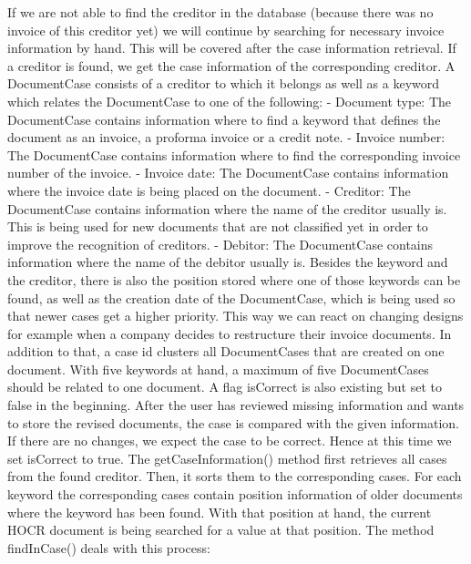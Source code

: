 If we are not able to find the creditor in the database (because there was no invoice of this creditor yet) we will continue by searching for necessary invoice information by hand. This will be covered after the case information retrieval.
If a creditor is found, we get the case information of the corresponding creditor. A DocumentCase consists of a creditor to which it belongs as well as a keyword which relates the DocumentCase to one of the following:
-	Document type: The DocumentCase contains information where to find a keyword that defines the document as an invoice, a proforma invoice or a credit note.
-	Invoice number: The DocumentCase contains information where to find the corresponding invoice number of the invoice.
-	Invoice date: The DocumentCase contains information where the invoice date is being placed on the document.
-	Creditor: The DocumentCase contains information where the name of the creditor usually is. This is being used for new documents that are not classified yet in order to improve the recognition of creditors.
-	Debitor: The DocumentCase contains information where the name of the debitor usually is.
Besides the keyword and the creditor, there is also the position stored where one of those keywords can be found, as well as the creation date of the DocumentCase, which is being used so that newer cases get a higher priority. This way we can react on changing designs for example when a company decides to restructure their invoice documents.
In addition to that, a case id clusters all DocumentCases that are created on one document. With five keywords at hand, a maximum of five DocumentCases should be related to one document.
A flag isCorrect is also existing but set to false in the beginning. After the user has reviewed missing information and wants to store the revised documents, the case is compared with the given information. If there are no changes, we expect the case to be correct. Hence at this time we set isCorrect to true.
The getCaseInformation() method first retrieves all cases from the found creditor. Then, it sorts them to the corresponding cases.
For each keyword the corresponding cases contain position information of older documents where the keyword has been found. With that position at hand, the current HOCR document is being searched for a value at that position. The method findInCase() deals with this process:

